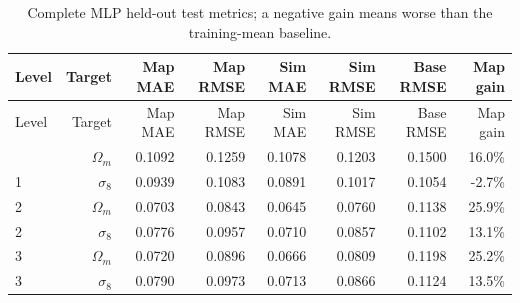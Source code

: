 \begingroup\footnotesize\setlength{\tabcolsep}{3pt}\renewcommand{\arraystretch}{1.05}
\begin{longtable}{lrrrrrrr}
\caption{Complete MLP held-out test metrics; a negative gain means worse than the training-mean baseline.}\label{tab:mlp-test}\\
\toprule
Level & Target & Map MAE & Map RMSE & Sim MAE & Sim RMSE & Base RMSE & Map gain \\
\midrule
\endfirsthead
\toprule
Level & Target & Map MAE & Map RMSE & Sim MAE & Sim RMSE & Base RMSE & Map gain \\
\midrule\endhead
\bottomrule\endfoot
1 & $\Omega_m$ & 0.1092 & 0.1259 & 0.1078 & 0.1203 & 0.1500 & 16.0\% \\
1 & $\sigma_8$ & 0.0939 & 0.1083 & 0.0891 & 0.1017 & 0.1054 & -2.7\% \\
2 & $\Omega_m$ & 0.0703 & 0.0843 & 0.0645 & 0.0760 & 0.1138 & 25.9\% \\
2 & $\sigma_8$ & 0.0776 & 0.0957 & 0.0710 & 0.0857 & 0.1102 & 13.1\% \\
3 & $\Omega_m$ & 0.0720 & 0.0896 & 0.0666 & 0.0809 & 0.1198 & 25.2\% \\
3 & $\sigma_8$ & 0.0790 & 0.0973 & 0.0713 & 0.0866 & 0.1124 & 13.5\% \\
\end{longtable}\endgroup
